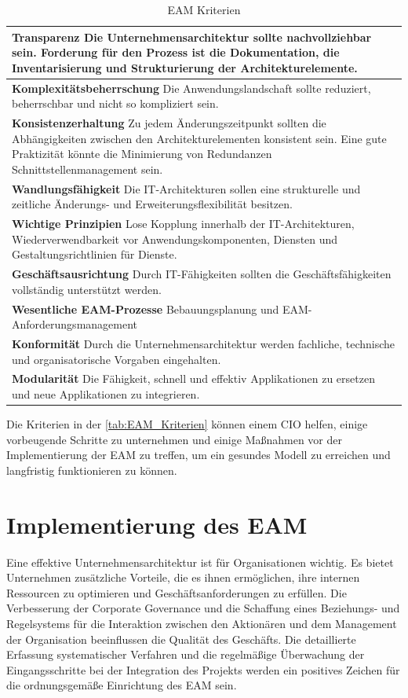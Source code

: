 \documentclass[
	A4paper,
	DIV=9,
	BCOR7mm,
	smallheadings,
	headinclude,
	footinclude,
	headsepline,
	parindent,
	german,
	captions=tableheading,
	abstracton
	]{scrreprt}
\begin{document}
\begin{table}[!h]
\caption{EAM Kriterien}
\begin{center}
\begin{tabularx}{\textwidth}{|X|}
\hline
\textbf{Transparenz}
Die Unternehmensarchitektur sollte nachvollziehbar sein.
Forderung für den Prozess ist die Dokumentation, die Inventarisierung und Strukturierung der Architekturelemente.
\\\hline
\textbf{Komplexitätsbeherrschung}
Die Anwendungslandschaft sollte reduziert, beherrschbar und nicht so kompliziert sein.
\\\hline
\textbf{Konsistenzerhaltung}
Zu jedem Änderungszeitpunkt sollten die Abhängigkeiten zwischen den Architekturelementen konsistent sein.
Eine gute Praktizität könnte die Minimierung von Redundanzen Schnittstellenmanagement sein. 
\\\hline
\textbf{Wandlungsfähigkeit}
Die IT-Architekturen sollen eine strukturelle und zeitliche Änderungs- und Erweiterungsflexibilität besitzen. 
\\\hline
\textbf{Wichtige Prinzipien}
Lose Kopplung innerhalb der IT-Architekturen, Wiederverwendbarkeit vor Anwendungskomponenten, Diensten und Gestaltungsrichtlinien für Dienste.
\\\hline
\textbf{Geschäftsausrichtung}
Durch IT-Fähigkeiten sollten die Geschäftsfähigkeiten vollständig unterstützt werden.
\\\hline
\textbf{Wesentliche EAM-Prozesse}
Bebauungsplanung und EAM-Anforderungsmanagement
\\\hline
\textbf{Konformität}
Durch die Unternehmensarchitektur werden fachliche, technische und organisatorische Vorgaben eingehalten.
\\\hline
\textbf{Modularität}
Die Fähigkeit, schnell und effektiv Applikationen zu ersetzen und neue Applikationen zu integrieren.
\\\hline
\end{tabularx}
\end{center}
\label{tab:EAM_Kriterien}
\end{table}

Die Kriterien in der \autoref{tab:EAM_Kriterien} können einem CIO helfen, einige vorbeugende Schritte zu unternehmen und einige Maßnahmen vor der Implementierung der EAM zu treffen, um ein gesundes Modell zu erreichen und langfristig funktionieren zu können.

\section{Implementierung des EAM}
Eine effektive Unternehmensarchitektur ist für Organisationen wichtig. Es bietet Unternehmen zusätzliche Vorteile, die es ihnen ermöglichen, ihre internen Ressourcen zu optimieren und Geschäftsanforderungen zu erfüllen. Die Verbesserung der Corporate Governance und die Schaffung eines Beziehungs- und Regelsystems für die Interaktion zwischen den Aktionären und dem Management der Organisation beeinflussen die Qualität des Geschäfts. Die detaillierte Erfassung systematischer Verfahren und die regelmäßige Überwachung der Eingangsschritte bei der Integration des Projekts werden ein positives Zeichen für die ordnungsgemäße Einrichtung des EAM sein.
\end{document}
